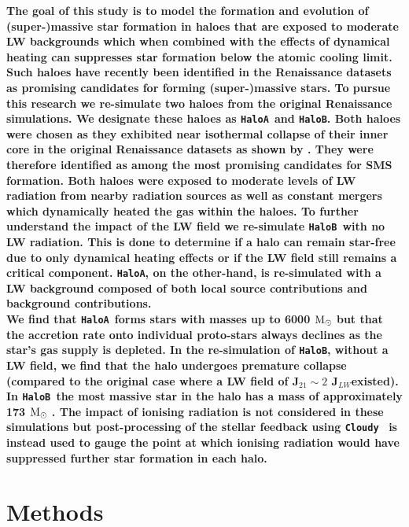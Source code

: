 \documentclass[graphics, twocolumn, usenatbib]{mn2e}
\newcommand{\cloudy}{\texttt{Cloudy~}}
\newcommand{\msolar} {$\rm{M_{\odot}}~$}
\newcommand{\JLW} {J$_{LW}$}
\newcommand{\ha} {\texttt{HaloA~}}
\newcommand{\hb} {\texttt{HaloB~}}
\newcommand{\hac} {\texttt{HaloA}}
\newcommand{\hbc} {\texttt{HaloB}}
\begin{document}
\textbf{The goal of this study is to model the formation and evolution of (super-)massive star
  formation in haloes that are exposed to moderate LW backgrounds which when combined with the effects
  of dynamical heating can suppresses star formation below the atomic cooling limit.
  Such haloes have recently been identified in the Renaissance datasets \citep{Wise_2019, Regan_2019}
  as promising candidates for forming (super-)massive stars.  To pursue this research we re-simulate
  two haloes from the original Renaissance simulations. We designate
  these haloes as \ha and \hbc. Both haloes were chosen as they exhibited near isothermal
  collapse of their inner core in the original Renaissance datasets as shown by \cite{Regan_2019}.
  They were therefore identified as among the most promising candidates for SMS formation. Both
  haloes were exposed to moderate levels of LW radiation from nearby radiation sources as well as
  constant mergers which dynamically heated the gas within the haloes. To further understand the
  impact of the LW field we re-simulate \hb with no LW radiation. This is done to determine if a
  halo can remain star-free due to only dynamical heating effects or if the LW field still
  remains a critical component. \hac, on the other-hand, is re-simulated with a LW background
  composed of both local source contributions and background contributions. \\
  \indent We find that \ha forms stars with masses up to 6000 \msolar but that the accretion
  rate onto individual proto-stars always declines as the star's gas supply is depleted. In the
  re-simulation of \hbc, without a LW field, we find that the halo undergoes premature collapse
  (compared to the original case where a LW field of J$_{21} \sim 2$ \JLW existed). In \hb the
  most massive star in the halo has a mass of approximately 173 \msolar. The impact of ionising
  radiation is not considered in these simulations but post-processing of the stellar feedback
  using \cloudy \citep{Ferland_2017} is instead used to gauge the point at which ionising radiation
  would have suppressed further star formation in each halo. }

\section{Methods} \label{Sec:Methods}
\end{document}
